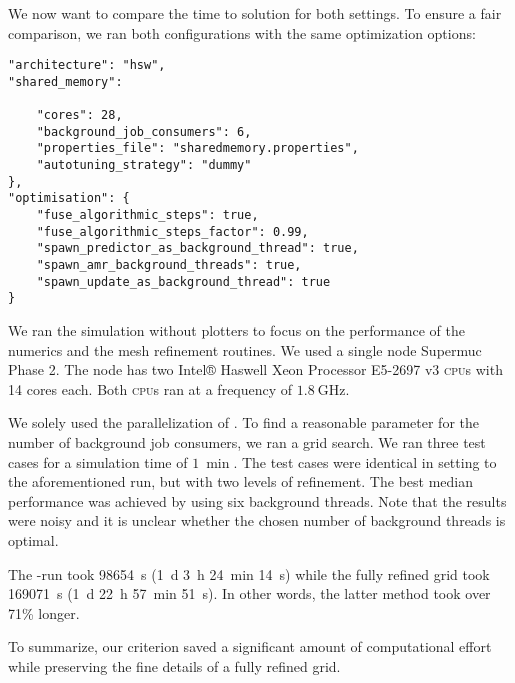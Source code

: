 We now want to compare the time to solution for both settings.
To ensure a fair comparison, we ran both configurations with the same optimization options:
\begin{verbatim}
"architecture": "hsw",
"shared_memory": 

    "cores": 28,
    "background_job_consumers": 6,
    "properties_file": "sharedmemory.properties",
    "autotuning_strategy": "dummy"
},
"optimisation": {
    "fuse_algorithmic_steps": true,
    "fuse_algorithmic_steps_factor": 0.99,
    "spawn_predictor_as_background_thread": true,
    "spawn_amr_background_threads": true,
    "spawn_update_as_background_thread": true
}
\end{verbatim}
We ran the simulation without plotters to focus on the performance of the numerics and the mesh refinement routines.
We used a single node Supermuc Phase 2.
The node has two Intel® Haswell Xeon Processor E5-2697 v3 \textsc{cpu}s with 14 cores each.
Both \textsc{cpu}s ran at a frequency of $\SI{1.8}{\GHz}$.

We solely used the \tbb{} parallelization of \exahype{}.
To find a reasonable parameter for the number of background job consumers, we ran a grid search.
We ran three \amr{} test cases for a simulation time of $\SI{1}{\min}$.
The test cases were identical in setting to the aforementioned \amr{} run, but with two levels of refinement.
The best median performance was achieved by using six background threads.
Note that the results were noisy and it is unclear whether the chosen number of background threads is optimal.

The \amr{}-run took \SI{98654}{\s} (\SI{1}{\day} \SI{3}{\hour} \SI{24}{\minute} \SI{14}{\s})
while the fully refined grid took \SI{169071}{\s} (\SI{1}{\day} \SI{22}{\hour} \SI{57}{\minute} \SI{51}{\s}).
In other words, the latter method took over 71\% longer.

To summarize, our \amr{} criterion saved a significant amount of computational effort while preserving the fine details of a fully refined grid.


